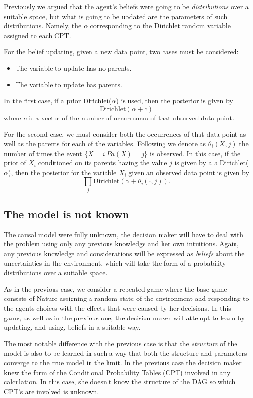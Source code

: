 \documentclass{article}
\begin{document}
Previously we argued that the agent's beliefs were going to be \textit{distributions} over a suitable space, but what is going to be updated are the parameters of such distributions. Namely, the $\alpha$ corresponding to the Dirichlet random variable assigned to each CPT.

For the belief updating, given a new data point,  two cases must be considered:
\begin{itemize}
\item The variable to update has no parents.
\item The variable to update has parents.
\end{itemize}

In the first case, if a prior Dirichlet($\alpha$) is used, then the posterior is given by
\[ \textrm{Dirichlet}(\alpha + c) \]
where $c$ is a vector of the number of occurrences of that observed data point. 

For the second case, we must consider both the occurrences of that data point as well as the parents for each of the variables. Following \cite{barber2012bayesian} we denote as $\theta_i(X,j)$ the number of times the event $\{X=i | Pa(X)=j\}$ is observed. In this case, if the prior of $X_i$ conditioned on its parents having the value $j$ is given by a a Dirichlet($\alpha$), then the posterior for the variable $X_i$ given an observed data point is given by 
\[ \prod_j \textrm{Dirichlet}(\alpha + \theta_i(\cdot,j)). \]

\subsection{The model is not known}
The causal model were fully unknown, the decision maker will have to deal with the problem using only any previous knowledge and her own intuitions. Again, any previous knowledge and considerations will be expressed as \textit{beliefs} about the uncertainties in the environment, which will take the form of a probability distributions over a suitable space. 

As in the previous case, we consider a repeated game where the base game consists of Nature assigning a random state of the environment and responding to the agents choices with the effects that were caused by her decisions. In this game, as well as in the previous one, the decision maker will attempt to learn by updating, and using, beliefs in a suitable way. 

The most notable difference with the previous case is that the \textit{structure} of the model is also to be learned in such a way that both the structure and parameters converge to the true model in the limit. In the previous case the decision maker knew the form of the Conditional Probability Tables (CPT) involved in any calculation. In this case, she doesn't know the structure of the DAG so which CPT's are involved is unknown.
\end{document}
